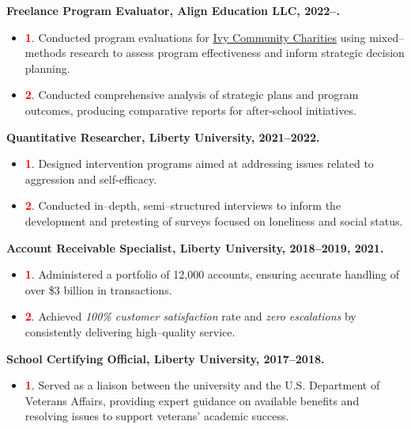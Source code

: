 \documentclass[11.5pt,article,oneside]{memoir}
\begin{document}
\ind \textbf{Freelance Program Evaluator, Align Education LLC, 2022–.}
\vspace{.5em}
\begin{itemize}
\item \textcolor{red}{\textbf{\normalsize 1}}. Conducted program evaluations for \href{https://www.iccpgc.org/}{Ivy Community Charities} using mixed–methods research to assess program effectiveness and inform strategic decision planning. 
\item \textcolor{red}{\textbf{\normalsize 2}}. Conducted comprehensive analysis of strategic plans and program outcomes, producing comparative reports for after-school initiatives.
\end{itemize}
\medskip

\ind \textbf{Quantitative Researcher, Liberty University, 2021–2022.}
\vspace{.5em}
\begin{itemize}
\item \textcolor{red}{\textbf{\normalsize 1}}. Designed intervention programs aimed at addressing issues related to aggression and self-efficacy.
\item \textcolor{red}{\textbf{\normalsize 2}}. Conducted in–depth, semi–structured interviews to inform the development and pretesting of surveys focused on loneliness and social status.
\end{itemize}
\medskip

\ind \textbf{Account Receivable Specialist, Liberty University, 2018–2019, 2021.}
\vspace{.5em}
\begin{itemize}
\item \textcolor{red}{\textbf{\normalsize 1}}. Administered a portfolio of 12,000 accounts, ensuring accurate handling of over \$3 billion in transactions. 
\item \textcolor{red}{\textbf{\normalsize 2}}. Achieved \emph{100\% customer satisfaction} rate and \emph{zero escalations} by consistently delivering high–quality service.
\end{itemize}
\medskip

\ind \textbf{School Certifying Official, Liberty University, 2017–2018.}
\vspace{.5em}
\begin{itemize}
\item \textcolor{red}{\textbf{\normalsize 1}}. Served as a liaison between the university and the U.S. Department of Veterans Affairs, providing expert guidance on available benefits and resolving issues to support veterans' academic success.
\end{itemize}
\bigskip
\end{document}
